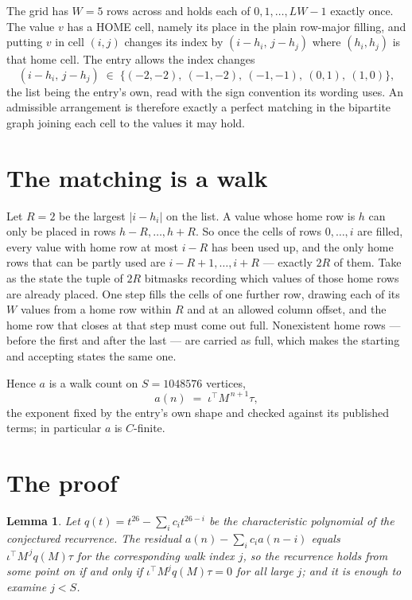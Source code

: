 \documentclass[11pt,a4paper]{article}
\theoremstyle{plain}
\newtheorem{lemma}[theorem]{Lemma}
\theoremstyle{definition}
\begin{document}
The grid has $W=5$ rows across and holds each of $0,1,\dots,LW-1$ exactly once. The value
$v$ has a HOME cell, namely its place in the plain row-major filling, and putting $v$ in cell
$(i,j)$ changes its index by $(i-h_i,\,j-h_j)$ where $(h_i,h_j)$ is that home cell. The entry
allows the index changes
\[
(i-h_i,\,j-h_j)\;\in\;\{(-2,-2),\ (-1,-2),\ (-1,-1),\ (0,1),\ (1,0)\},
\]
the list being the entry's own, read with the sign convention its wording uses. An admissible
arrangement is therefore exactly a perfect matching in the bipartite graph joining each cell to
the values it may hold.

\section{The matching is a walk}

Let $R=2$ be the largest $|i-h_i|$ on the list. A value whose home row is $h$ can only be
placed in rows $h-R,\dots,h+R$. So once the cells of rows $0,\dots,i$ are filled, every
value with home row at most $i-R$ has been used up, and the only home rows that can be
partly used are $i-R+1,\dots,i+R$ --- exactly $2R$ of them. Take as the state the tuple of
$2R$ bitmasks recording which values of those home rows are already placed. One step fills
the cells of one further row, drawing each of its $W$ values from a home row within $R$
and at an allowed column offset, and the home row that closes at that step must come out
full. Nonexistent home rows --- before the first and after the last --- are carried as
full, which makes the starting and accepting states the same one.

Hence $a$ is a walk count on $S=1048576$ vertices,
\[
a(n)\;=\;\iota^{\!\top}M^{\,n+1}\tau ,
\]
the exponent fixed by the entry's own shape and checked against its published terms; in
particular $a$ is $C$-finite.

\section{The proof}

\begin{lemma}\label{lem:crit}
Let $q(t)=t^{26}-\sum_i c_it^{26-i}$ be the characteristic polynomial of the
conjectured recurrence. The residual $a(n)-\sum_ic_ia(n-i)$ equals
$\iota^{\!\top}M^{\,j}q(M)\tau$ for the corresponding walk index $j$, so the recurrence
holds from some point on if and only if $\iota^{\!\top}M^{j}q(M)\tau=0$ for all large $j$;
and it is enough to examine $j<S$.
\end{lemma}
\end{document}
